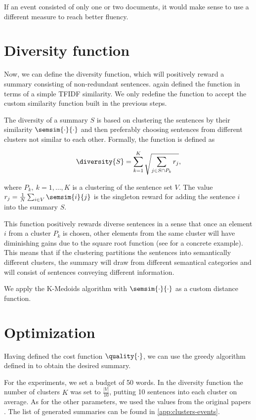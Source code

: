 If an event consisted of only one or two documents, it would make sense to use a different measure to reach better fluency.

\section{Diversity function}

Now, we can define the diversity function, which will positively reward a summary consisting of non-redundant sentences. \cite{multi-summarization-2} again defined the function in terms of a simple TFIDF similarity. We only redefine the function to accept the custom similarity function built in the previous steps.

The diversity of a summary $S$ is based on clustering the sentences by their similarity $\semsim{\cdot}{\cdot}$ and then preferably choosing sentences from different clusters not similar to each other. Formally, the function is defined as

\begin{equation}
	\diversity{S} = \sum_{k = 1}^{K} \sqrt{\sum_{j \in S \cap P_{k}} r_{j}},
\end{equation}

where $P_{k},\ k = 1, \dots, K$ is a clustering of the sentence set $V$. The value $r_{j} = \frac{1}{N} \sum_{i \in V} \semsim{i}{j}$ is the singleton reward for adding the sentence $i$ into the summary $S$.

This function positively rewards diverse sentences in a sense that once an element $i$ from a cluster $P_{k}$ is chosen, other elements from the same cluster will have diminishing gains due to the square root function (see \cite{multi-summarization-2} for a concrete example). This means that if the clustering partitions the sentences into semantically different clusters, the summary will draw from different semantical categories and will consist of sentences conveying different information.

We apply the K-Medoids algorithm with $\semsim{\cdot}{\cdot}$ as a custom distance function.


\section{Optimization}
Having defined the cost function $\quality{\cdot}$, we can use the greedy algorithm defined in \cite{multi-summarization-1} to obtain the desired summary.

For the experiments, we set a budget of 50 words. In the diversity function the number of clusters $K$ was set to $\frac{\left| V \right|}{10}$, putting 10 sentences into each cluster on average. As for the other parameters, we used the values from the original papers \citep{multi-summarization-1, multi-summarization-2}. The list of generated summaries can be found in \autoref{app:clusters-events}.